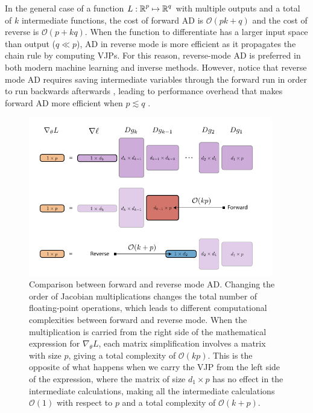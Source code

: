 In the general case of a function $L : \operatorname{\mathbb{R}}^p \mapsto \operatorname{\mathbb{R}}^q$ with multiple outputs and a total of $k$ intermediate functions, the cost of forward AD is $\mathcal O (pk + q)$ and the cost of reverse is $\mathcal O (p + kq)$.
When the function to differentiate has a larger input space than output ($q \ll p$), AD in reverse mode is more efficient as it propagates the chain rule by computing VJPs.
For this reason, reverse-mode AD is preferred in both modern machine learning and inverse methods.
However, notice that reverse mode AD requires saving intermediate variables through the forward run in order to run backwards afterwards \cite{Bennett_1973}, leading to performance overhead that makes forward AD more efficient when $p \lesssim q$ \cite{Griewank_1989, Margossian_2018, Baydin_Pearlmutter_Radul_Siskind_2015}. 

\begin{figure}[t]
    \centering
    \includegraphics[width=0.95\textwidth]{figures/VJP-AD.pdf}
    \caption{Comparison between forward and reverse mode AD. Changing the order of Jacobian multiplications changes the total number of floating-point operations, which leads to different computational complexities between forward and reverse mode. When the multiplication is carried from the right side of the mathematical expression for $\nabla_\theta L$, each matrix simplification involves a matrix with size $p$, giving a total complexity of $\mathcal O (kp)$. This is the opposite of what happens when we carry the VJP from the left side of the expression, where the matrix of size $d_1 \times p$ has no effect in the intermediate calculations, making all the intermediate calculations $\mathcal O (1)$ with respect to $p$ and a total complexity of $\mathcal O (k + p)$. }
    \label{fig:vjp-jvp}
\end{figure}


